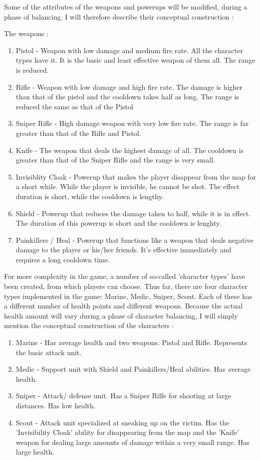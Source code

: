 \documentclass{article}
\begin{document}
Some of the attributes of the weapons and powerups will be modified, during a
phase of balancing. I will therefore describe their conceptual construction : 

The weapons : 
\begin{enumerate}
  \item Pistol - Weapon with low damage and medium fire rate. All the character
  types have it. It is the basic and least effective weapon of them all. The
  range is reduced.
  \item Rifle - Weapon with low damage and high fire rate. The damage is higher
  than that of the pistol and the cooldown takes half as long. The range is
  reduced the same as that of the Pistol
  \item Sniper Rifle - High damage weapon with very low fire rate. The range is
  far greater than that of the Rifle and Pistol.
  \item Knife - The weapon that deals the highest damage of all. The cooldown is
  greater than that of the Sniper Rifle and the range is very small. 
  \item Invisiblity Cloak - Powerup that makes the player disappear from the
  map for a short while. While the player is invisible, he cannot be shot.
  The effect duration is short, while the cooldown is lengthy.
  \item Shield - Powerup that reduces the damage taken to half, while it is in
  effect. The duration of this powerup is short and the cooldown is lenghty.
  \item Painkillers / Heal - Powerup that functions like a weapon that deals
  negative damage to the player or his/her friends. It's effective immediately
  and requires a long cooldown time.
\end{enumerate}

For more complexity in the game, a number of so-called 'character types' have
been created, from which players can choose. Thus far, there are four character
types implemented in the game: Marine, Medic, Sniper, Scout. Each of these has a
different number of health points and different weapons. Because the actual
health amount will vary during a phase of character balancing, I will simply
mention the conceptual construction of the characters :
\begin{enumerate}
  \item Marine - Has average health and two weapons: Pistol and Rifle.
  Represents the basic attack unit.
  \item Medic - Support unit with Shield and Painkillers/Heal abilities. Has
  average health. 
  \item Sniper - Attack/ defense unit. Has a Sniper Rilfe for shooting at large
  distances. Has low health.
  \item Scout - Attack unit specialized at sneaking up on the victim. Has the
  'Invisibility Cloak' ability for disappearing from the map and the 'Knife'
  weapon for dealing large amounts of damage within a very small range. Has
  large health.
\end{enumerate}
\end{document}
